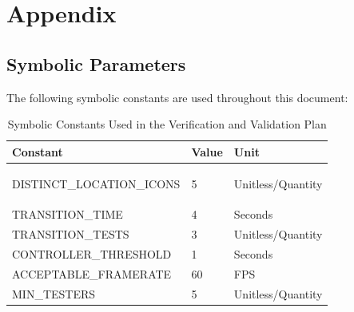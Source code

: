 \documentclass[12pt, titlepage]{article}
\begin{document}







\newpage{}


% 


\newpage
\section{Appendix}

\subsection{Symbolic Parameters}

The following symbolic constants are used throughout this document:

\begin{table}[htbp]
	\centering
	\caption{Symbolic Constants Used in the Verification and Validation Plan}
	\label{tab:symbolicparameters}
	\begin{tabularx}{\textwidth}{| p{6.1cm} | p{2.1cm} | X|}
		\hline
		\textbf{Constant} & \textbf{Value} & \textbf{Unit}\\
		\hline
		\leavevmode\hypertarget{DISTINCT_LOCATION_ICONS}{DISTINCT\_LOCATION\_ICONS}
		 & 5 
		& Unitless/Quantity\\
		\hline
		\leavevmode\hypertarget{TRANSITION_TIME}{TRANSITION\_TIME} & 4 & 
		Seconds\\
		\hline
		\leavevmode\hypertarget{TRANSITION_TESTS}{TRANSITION\_TESTS} & 3 & 
		Unitless/Quantity\\
		\hline
    	\leavevmode\hypertarget{ControllerThreshold}{CONTROLLER\_THRESHOLD} & 1 & Seconds\\
		\hline
		\leavevmode\hypertarget{ACCEPTABLE_FRAMERATE}{ACCEPTABLE\_FRAMERATE} & 60
		& FPS\\
\hline

		\leavevmode\hypertarget{MIN_TESTERS}{MIN\_TESTERS} & 5 & 
		Unitless/Quantity\\
		\hline
	\end{tabularx}
\end{table}
\end{document}
